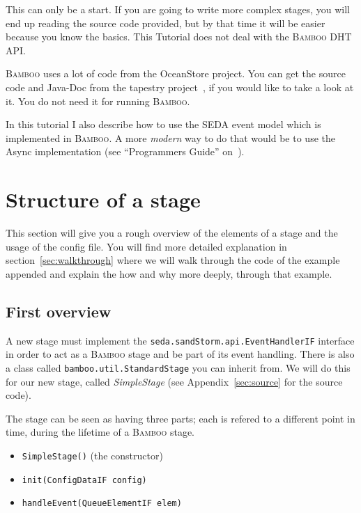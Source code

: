 \documentclass[twocolumn, twoside, a4paper]{article}
\begin{document}
This can only be a start. If you are going to write more complex
stages, you will end up reading the source code provided, but by that
time it will be easier because you know the basics. This Tutorial does
not deal with the \textsc{Bamboo} DHT API. 

\textsc{Bamboo} uses a lot of code from the Ocean\-Store project. You
can get the source code and Java-Doc from the tapestry
project~\cite{tapestry}, if you would like to take a look at it. You
do not need it for running \textsc{Bamboo}.

In this tutorial I also describe how to use the SEDA
event model which is implemented in \textsc{Bamboo}. A more \emph{modern} way
to do that would be to use the Async implementation (see ``Programmers
Guide'' on~\cite{bamboo}). 


\section{Structure of a stage}
\label{sec:structure}

This section will give you a rough overview of the elements of a
stage and the usage of the config file. You will find more detailed
explanation in section~\ref{sec:walkthrough} where we will walk through
the code of the example appended and explain the how and
why more deeply, through that example.


\subsection{First overview}
\label{sec:first}

A new stage must implement the \texttt{seda.sandStorm.api.EventHandlerIF} interface in order to
act as a \textsc{Bamboo} stage and be part of its event handling. There is
also a class called \texttt{bamboo.util.StandardStage} you can inherit
from. We will do this for our new stage, called \emph{SimpleStage}
(see Appendix~\ref{sec:source} for the source code).

The stage can be seen as having three parts; each is refered to a
different point in time, during the lifetime of a \textsc{Bamboo} stage.

\begin{itemize}
\item \texttt{SimpleStage()} (the constructor)
\item \texttt{init(ConfigDataIF config)}
\item \texttt{handleEvent(QueueElementIF elem)}
\end{itemize}
\end{document}
